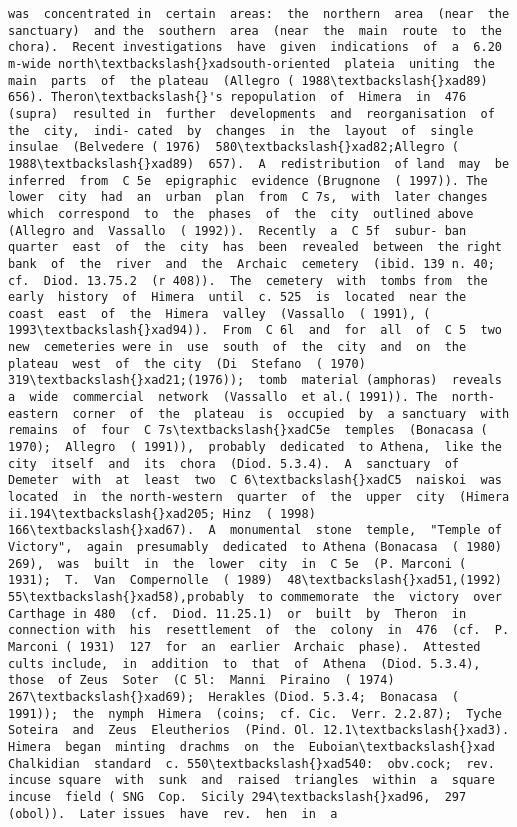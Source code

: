 \documentclass[11pt]{article}
\begin{document}
\begin{Verbatim}[commandchars=\\\{\}]
was  concentrated in  certain  areas:  the  northern  area  (near  the  sanctuary)  and the  southern  area  (near  the  main  route  to  the  chora).  Recent investigations  have  given  indications  of  a  6.20  m-wide north\textbackslash{}xadsouth-oriented  plateia  uniting  the  main  parts  of  the plateau  (Allegro ( 1988\textbackslash{}xad89)  656). Theron\textbackslash{}'s repopulation  of  Himera  in  476  (supra)  resulted in  further  developments  and  reorganisation  of  the  city,  indi- cated  by  changes  in  the  layout  of  single  insulae  (Belvedere ( 1976)  580\textbackslash{}xad82;Allegro ( 1988\textbackslash{}xad89)  657).  A  redistribution  of land  may  be  inferred  from  C 5e  epigraphic  evidence (Brugnone  ( 1997)). The  lower  city  had  an  urban  plan  from  C 7s,  with  later changes  which  correspond  to  the  phases  of  the  city  outlined above  (Allegro and  Vassallo  ( 1992)).  Recently  a  C 5f  subur- ban  quarter  east  of  the  city  has  been  revealed  between  the right  bank  of  the  river  and  the  Archaic  cemetery  (ibid. 139 n. 40;  cf.  Diod. 13.75.2  (r 408)).  The  cemetery  with  tombs from  the  early  history  of  Himera  until  c. 525  is  located  near the  coast  east  of  the  Himera  valley  (Vassallo  ( 1991), ( 1993\textbackslash{}xad94)).  From  C 6l  and  for  all  of  C 5  two  new  cemeteries were in  use  south  of  the  city  and  on  the  plateau  west  of  the city  (Di  Stefano  ( 1970)  319\textbackslash{}xad21;(1976));  tomb  material (amphoras)  reveals  a  wide  commercial  network  (Vassallo  et al.( 1991)). The  north-eastern  corner  of  the  plateau  is  occupied  by  a sanctuary  with  remains  of  four  C 7s\textbackslash{}xadC5e  temples  (Bonacasa ( 1970);  Allegro  ( 1991)),  probably  dedicated  to Athena,  like the  city  itself  and  its  chora  (Diod. 5.3.4).  A  sanctuary  of Demeter  with  at  least  two  C 6\textbackslash{}xadC5  naiskoi  was  located  in  the north-western  quarter  of  the  upper  city  (Himera ii.194\textbackslash{}xad205; Hinz  ( 1998)  166\textbackslash{}xad67).  A  monumental  stone  temple,  "Temple of  Victory",  again  presumably  dedicated  to Athena (Bonacasa  ( 1980)  269),  was  built  in  the  lower  city  in  C 5e  (P. Marconi ( 1931);  T.  Van  Compernolle  ( 1989)  48\textbackslash{}xad51,(1992) 55\textbackslash{}xad58),probably  to commemorate  the  victory  over  Carthage in 480  (cf.  Diod. 11.25.1)  or  built  by  Theron  in  connection with  his  resettlement  of  the  colony  in  476  (cf.  P.  Marconi ( 1931)  127  for  an  earlier  Archaic  phase).  Attested  cults include,  in  addition  to  that  of  Athena  (Diod. 5.3.4),  those  of Zeus  Soter  (C 5l:  Manni  Piraino  ( 1974)  267\textbackslash{}xad69);  Herakles (Diod. 5.3.4;  Bonacasa  ( 1991));  the  nymph  Himera  (coins;  cf. Cic.  Verr. 2.2.87);  Tyche  Soteira  and  Zeus  Eleutherios  (Pind. Ol. 12.1\textbackslash{}xad3). Himera  began  minting  drachms  on  the  Euboian\textbackslash{}xad Chalkidian  standard  c. 550\textbackslash{}xad540:  obv.cock;  rev.  incuse square  with  sunk  and  raised  triangles  within  a  square  incuse  field ( SNG  Cop.  Sicily 294\textbackslash{}xad96,  297  (obol)).  Later issues  have  rev.  hen  in  a  
\end{Verbatim}
\end{document}
